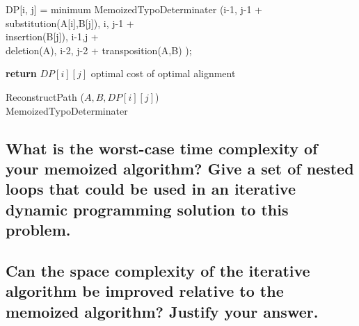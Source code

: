 \documentclass[letterpaper,12pt]{article}
\begin{document}
\IncMargin{1em}
\begin{algorithm}
\BlankLine
{}
{DP[i, j] = minimum MemoizedTypoDeterminater (i-1, j-1 + \\
     substitution(A[i],B[j]), i, j-1  +\\ 
     insertion(B[j]), i-1,j   + \\
     deletion(A), i-2, j-2 + transposition(A,B)   );\newline
    
\textbf{return} {$DP[i][j]$ optimal cost of optimal alignment }}
{ReconstructPath} {($A,B, DP[i][j]$) }\\
\caption{MemoizedTypoDeterminater\label{IR2}}

\end{algorithm}\DecMargin{1em}

\clearpage 
\subsection{What is the worst-case time complexity of your memoized algorithm? Give a set of nested loops that could be used in an iterative dynamic programming solution to this problem.}


\subsection{Can the space complexity of the iterative algorithm be improved relative to the memoized algorithm? Justify your answer.}
\end{document}
